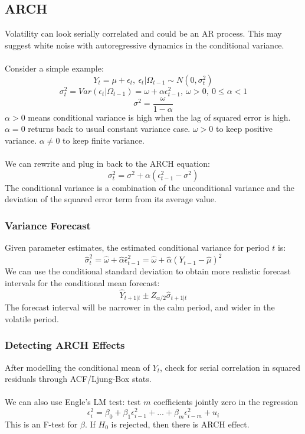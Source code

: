 \documentclass{article}
\begin{document}
\subsection{ARCH}
Volatility can look serially correlated and could be an AR process. This may suggest white noise with autoregressive dynamics in the conditional variance.\\
\\
Consider a simple example:
$$Y_t = \mu + \epsilon_t, \ \epsilon_t|\Omega_{t-1} \sim N(0, \sigma_t^2)$$
$$\sigma_t^2 = Var(\epsilon_t|\Omega_{t-1}) = \omega + \alpha \epsilon_{t-1}^2, \ \omega > 0, \ 0\leq \alpha < 1$$
$$\sigma^2 = \frac{\omega}{1-\alpha}$$
$\alpha > 0$ means conditional variance is high when the lag of squared error is high. $\alpha = 0$ returns back to usual constant variance case. $\omega > 0$ to keep positive variance. $\alpha \neq 0$ to keep finite variance.\\
\\
We can rewrite and plug in back to the ARCH equation:
$$\sigma_t^2 = \sigma^2 + \alpha (\epsilon_{t-1}^2 - \sigma^2)$$
The conditional variance is a combination of the unconditional variance and the deviation of the squared error term from its average value.

\subsubsection{Variance Forecast}
Given parameter estimates, the estimated conditional variance for period $t$ is:
$$\hat{\sigma}_t^2 = \hat{\omega} + \hat{\alpha} \hat{\epsilon}_{t-1}^2 = \hat{\omega} + \hat{\alpha} (Y_{t-1} - \hat{\mu})^2$$
We can use the conditional standard deviation to obtain more realistic forecast intervals for the conditional mean forecast:
$$\hat{Y}_{t+1|t} \pm Z_{\alpha/2} \hat{\sigma}_{t+1|t}$$
The forecast interval will be narrower in the calm period, and wider in the volatile period.

\subsubsection{Detecting ARCH Effects}
After modelling the conditional mean of $Y_t$, check for serial correlation in squared residuals through ACF/Ljung-Box stats.\\
\\
We can also use Engle's LM test: test $m$ coefficients jointly zero in the regression
$$\epsilon_i^2 = \beta_0 + \beta_1 \epsilon_{i-1}^2 + ... + \beta_m \epsilon_{i-m}^2 + u_i$$
This is an F-test for $\beta$. If $H_0$ is rejected, then there is ARCH effect.
\end{document}
